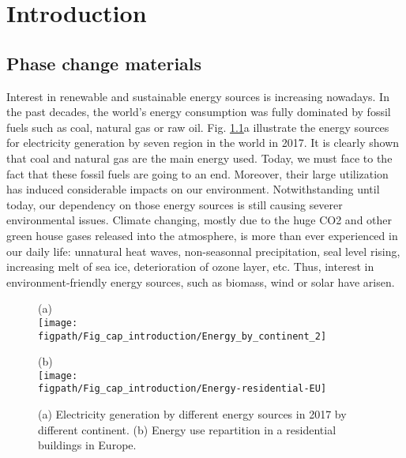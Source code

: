 \def\titcourt{Introduction}
\def\titlong{Introduction}
\chapter[\titlong]{\titlong%
              \chaptermark{\titcourt}}
\chaptermark{\titcourt}

\section{Phase change materials}

Interest in renewable and sustainable energy sources is increasing nowadays. 
In the past decades, the world's energy consumption was fully dominated by fossil fuels such as coal, natural gas or raw oil.
Fig. \ref{fig-Energ-cons}a illustrate the energy sources for electricity generation by seven region in the world in 2017.
It is clearly shown that coal and natural gas are the main energy used. 
Today, we must face to the fact that these fossil fuels are going to an end.
Moreover, their large utilization has induced considerable impacts on our environment.
Notwithstanding until today, our dependency on those energy sources is still causing severer environmental issues.
Climate changing, mostly due to the huge CO2 and other green house gases released into the atmosphere, is more than ever experienced in our daily life:
unnatural heat waves, non-seasonnal precipitation, seal level rising, increasing melt of sea ice, deterioration of ozone layer, etc.
Thus, interest in environment-friendly energy sources, such as biomass, wind or solar have arisen.

\begin{figure}
\begin{center}
	\begin{minipage}{.49\textwidth}
		(a) \\
		\texttt{[image: \\figpath/Fig\_cap\_introduction/Energy\_by\_continent\_2]}
	\end{minipage}
		\begin{minipage}{.50\textwidth}
		(b) \\
		\texttt{[image: \\figpath/Fig\_cap\_introduction/Energy-residential-EU]}
	\end{minipage}
	\caption{(a) Electricity generation by different energy sources in 2017 by different continent. (b) Energy use repartition in a residential buildings in Europe.}
	 \label{fig-Energ-cons}
\end{center}	
\end{figure}

